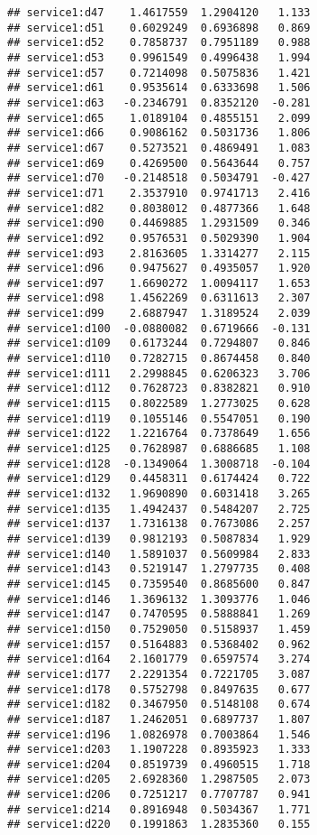 \documentclass[
]{article}
\begin{document}
\begin{verbatim}
## service1:d47    1.4617559  1.2904120   1.133
## service1:d51    0.6029249  0.6936898   0.869
## service1:d52    0.7858737  0.7951189   0.988
## service1:d53    0.9961549  0.4996438   1.994
## service1:d57    0.7214098  0.5075836   1.421
## service1:d61    0.9535614  0.6333698   1.506
## service1:d63   -0.2346791  0.8352120  -0.281
## service1:d65    1.0189104  0.4855151   2.099
## service1:d66    0.9086162  0.5031736   1.806
## service1:d67    0.5273521  0.4869491   1.083
## service1:d69    0.4269500  0.5643644   0.757
## service1:d70   -0.2148518  0.5034791  -0.427
## service1:d71    2.3537910  0.9741713   2.416
## service1:d82    0.8038012  0.4877366   1.648
## service1:d90    0.4469885  1.2931509   0.346
## service1:d92    0.9576531  0.5029390   1.904
## service1:d93    2.8163605  1.3314277   2.115
## service1:d96    0.9475627  0.4935057   1.920
## service1:d97    1.6690272  1.0094117   1.653
## service1:d98    1.4562269  0.6311613   2.307
## service1:d99    2.6887947  1.3189524   2.039
## service1:d100  -0.0880082  0.6719666  -0.131
## service1:d109   0.6173244  0.7294807   0.846
## service1:d110   0.7282715  0.8674458   0.840
## service1:d111   2.2998845  0.6206323   3.706
## service1:d112   0.7628723  0.8382821   0.910
## service1:d115   0.8022589  1.2773025   0.628
## service1:d119   0.1055146  0.5547051   0.190
## service1:d122   1.2216764  0.7378649   1.656
## service1:d125   0.7628987  0.6886685   1.108
## service1:d128  -0.1349064  1.3008718  -0.104
## service1:d129   0.4458311  0.6174424   0.722
## service1:d132   1.9690890  0.6031418   3.265
## service1:d135   1.4942437  0.5484207   2.725
## service1:d137   1.7316138  0.7673086   2.257
## service1:d139   0.9812193  0.5087834   1.929
## service1:d140   1.5891037  0.5609984   2.833
## service1:d143   0.5219147  1.2797735   0.408
## service1:d145   0.7359540  0.8685600   0.847
## service1:d146   1.3696132  1.3093776   1.046
## service1:d147   0.7470595  0.5888841   1.269
## service1:d150   0.7529050  0.5158937   1.459
## service1:d157   0.5164883  0.5368402   0.962
## service1:d164   2.1601779  0.6597574   3.274
## service1:d177   2.2291354  0.7221705   3.087
## service1:d178   0.5752798  0.8497635   0.677
## service1:d182   0.3467950  0.5148108   0.674
## service1:d187   1.2462051  0.6897737   1.807
## service1:d196   1.0826978  0.7003864   1.546
## service1:d203   1.1907228  0.8935923   1.333
## service1:d204   0.8519739  0.4960515   1.718
## service1:d205   2.6928360  1.2987505   2.073
## service1:d206   0.7251217  0.7707787   0.941
## service1:d214   0.8916948  0.5034367   1.771
## service1:d220   0.1991863  1.2835360   0.155

\end{verbatim}
\end{document}
